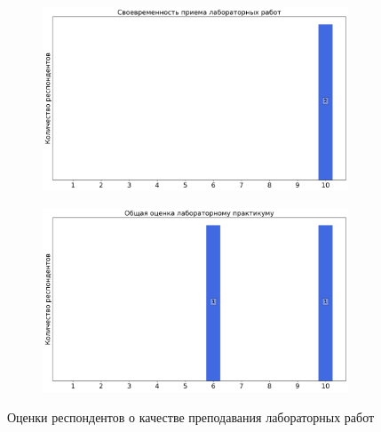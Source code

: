 \begin{figure}[H]
\begin{subfigure}[b]{0.45\textwidth}
                \includegraphics[width=\textwidth]{images/2 course/Радиотехнические цепи и сигналы/labniks-marks-Скурихин А.В.-2.png}
            \end{subfigure}
            \begin{subfigure}[b]{0.45\textwidth}
                \centering
                \includegraphics[width=\textwidth]{images/2 course/Радиотехнические цепи и сигналы/labniks-marks-Скурихин А.В.-3.png}
            \end{subfigure}	
            \caption{Оценки респондентов о качестве преподавания лабораторных работ}
        \end{figure}


